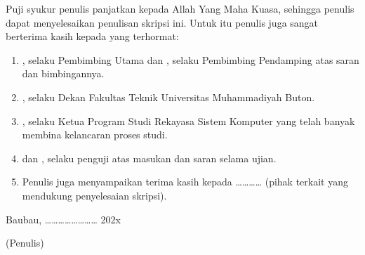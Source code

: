 Puji syukur penulis panjatkan kepada Allah Yang Maha Kuasa, sehingga penulis dapat menyelesaikan penulisan skripsi ini. Untuk itu penulis juga sangat berterima kasih kepada yang terhormat:
\begin{enumerate}
\item \PembimbingI, selaku Pembimbing Utama dan \PembimbingII, selaku Pembimbing Pendamping atas saran dan bimbingannya.
\item \Dekan, selaku Dekan Fakultas Teknik Universitas Muhammadiyah Buton.
\item \KetuaProdi, selaku Ketua Program Studi Rekayasa Sistem Komputer yang telah banyak membina kelancaran proses studi.
\item \PengujiI{} dan \PengujiII, selaku penguji atas masukan dan saran selama ujian.
\item Penulis juga menyampaikan terima kasih kepada ………… (pihak terkait yang mendukung penyelesaian skripsi).
\end{enumerate}

\begin{kanan}
Baubau, …………………… 202x

(Penulis)
\end{kanan}

